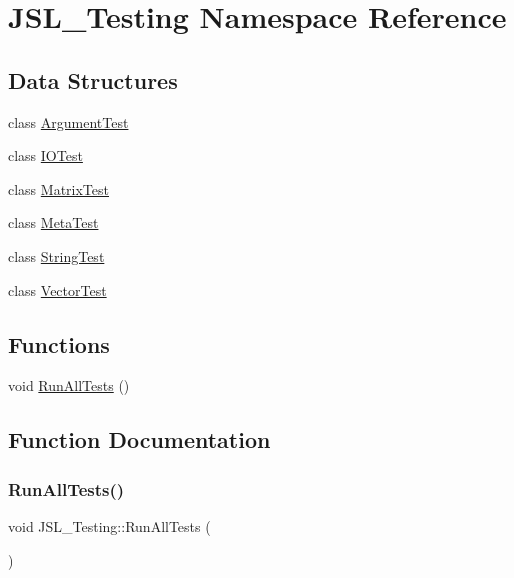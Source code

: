 \hypertarget{namespaceJSL__Testing}{}\section{J\+S\+L\+\_\+\+Testing Namespace Reference}
\label{namespaceJSL__Testing}
\subsection*{Data Structures}
\begin{DoxyCompactItemize}
\item 
class \hyperlink{classJSL__Testing_1_1ArgumentTest}{Argument\+Test}
\item 
class \hyperlink{classJSL__Testing_1_1IOTest}{I\+O\+Test}
\item 
class \hyperlink{classJSL__Testing_1_1MatrixTest}{Matrix\+Test}
\item 
class \hyperlink{classJSL__Testing_1_1MetaTest}{Meta\+Test}
\item 
class \hyperlink{classJSL__Testing_1_1StringTest}{String\+Test}
\item 
class \hyperlink{classJSL__Testing_1_1VectorTest}{Vector\+Test}
\end{DoxyCompactItemize}
\subsection*{Functions}
\begin{DoxyCompactItemize}
\item 
void \hyperlink{namespaceJSL__Testing_a509a70d20fdc2e9975d9b0b8ae424ef1}{Run\+All\+Tests} ()
\end{DoxyCompactItemize}


\subsection{Function Documentation}
\mbox{\label{namespaceJSL__Testing_a509a70d20fdc2e9975d9b0b8ae424ef1}} 
\subsubsection{\texorpdfstring{Run\+All\+Tests()}{RunAllTests()}}
{\footnotesize\ttfamily void J\+S\+L\+\_\+\+Testing\+::\+Run\+All\+Tests (\begin{DoxyParamCaption}{ }\end{DoxyParamCaption})\hspace{0.3cm}{\ttfamily [inline]}}

